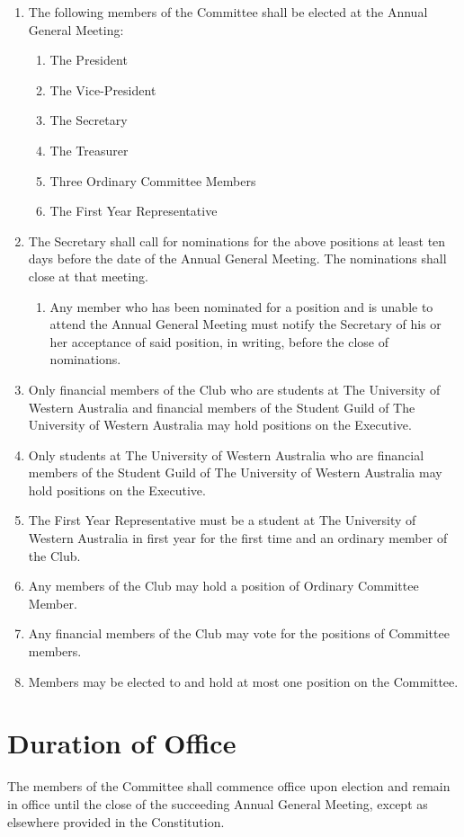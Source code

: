 \documentclass[11pt]{article} %
\begin{document}
\begin{enumerate}
	\item The following members of the Committee shall be elected at the Annual General Meeting:
		\begin{enumerate}[1.]
			\item The President
			\item The Vice-President
			\item The Secretary
			\item The Treasurer
			\item Three Ordinary Committee Members
			\item The First Year Representative
		\end{enumerate}
	\item The Secretary shall call for nominations for the above positions at least ten days before the date of the Annual General Meeting. The nominations shall close at that meeting.
	\begin{enumerate}[1.]
			\item Any member who has been nominated for a position and is unable to attend the Annual General Meeting must notify the Secretary of his or her acceptance of said position, in writing, before the close of nominations.
		\end{enumerate}
	\item Only financial members of the Club who are students at The University of Western Australia and financial members of the Student Guild of The University of Western Australia may hold positions on the Executive.
	\item Only students at The University of Western Australia who are financial members of the Student Guild of The University of Western Australia may hold positions on the Executive.
	\item The First Year Representative must be a student at The University of Western Australia in first year for the first time and an ordinary member of the Club.
	\item Any members of the Club may hold a position of Ordinary Committee Member.
	\item Any financial members of the Club may vote for the positions of Committee members.
	\item Members may be elected to and hold at most one position on the Committee.
\end{enumerate}

\section{Duration of Office}
The members of the Committee shall commence office upon election and remain in office until the close of the succeeding Annual General Meeting, except as elsewhere provided in the Constitution.
\end{document}
